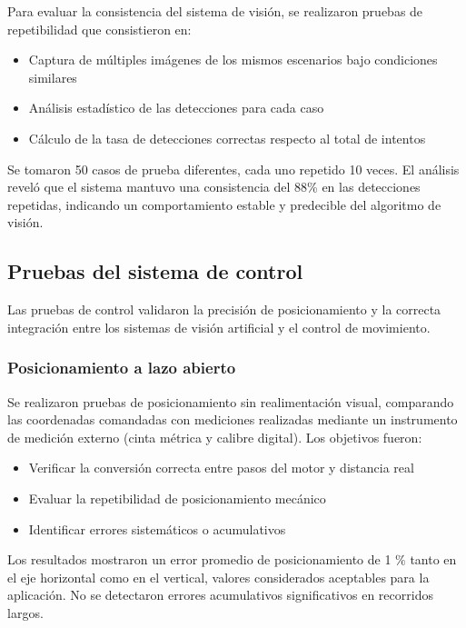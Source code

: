 Para evaluar la consistencia del sistema de visión, se realizaron pruebas de repetibilidad que consistieron en:

\begin{itemize}
    \item Captura de múltiples imágenes de los mismos escenarios bajo condiciones similares
    \item Análisis estadístico de las detecciones para cada caso
    \item Cálculo de la tasa de detecciones correctas respecto al total de intentos
\end{itemize}

Se tomaron 50 casos de prueba diferentes, cada uno repetido 10 veces. El análisis reveló que el sistema mantuvo una consistencia del 88\% en las detecciones repetidas, indicando un comportamiento estable y predecible del algoritmo de visión.

\subsection{Pruebas del sistema de control}

Las pruebas de control validaron la precisión de posicionamiento y la correcta integración entre los sistemas de visión artificial y el control de movimiento.

\subsubsection{Posicionamiento a lazo abierto}

Se realizaron pruebas de posicionamiento sin realimentación visual, comparando las coordenadas comandadas con mediciones realizadas mediante un instrumento de medición externo (cinta métrica y calibre digital). Los objetivos fueron:

\begin{itemize}
    \item Verificar la conversión correcta entre pasos del motor y distancia real
    \item Evaluar la repetibilidad de posicionamiento mecánico
    \item Identificar errores sistemáticos o acumulativos
\end{itemize}

Los resultados mostraron un error promedio de posicionamiento de 1 $\%$ tanto en el eje horizontal como en el vertical, valores considerados aceptables para la aplicación. No se detectaron errores acumulativos significativos en recorridos largos.

